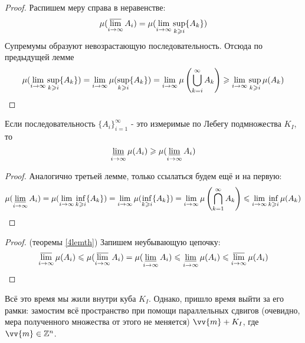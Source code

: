 \begin{proof}
	Распишем меру справа в неравенстве:
	\[
		\mu(\varlimsup_{i \to \infty} A_i) = \mu(\liml_{i \to \infty} \sup_{k \ge i} \{A_k\})
	\]
	Супремумы образуют невозрастающую последовательность. Отсюда по предыдущей лемме
	\[
		\mu(\liml_{i \to \infty} \sup_{k \ge i} \{A_k\}) = \liml_{i \to \infty} \mu(\sup_{k \ge i} \{A_k\}) = \liml_{i \to \infty} \mu\left(\bigcup_{k = i}^\infty A_k\right) \ge \liml_{i \to \infty} \sup_{k \ge i} \mu(A_k)
	\]
\end{proof}

\begin{lemma}
	Если последовательность $\{A_i\}_{i = 1}^\infty$ - это измеримые по Лебегу подмножества $K_I$, то
	\[
		\varliminf_{i \to \infty} \mu(A_i) \ge \mu(\varliminf_{i \to \infty} A_i)
	\]
\end{lemma}

\begin{proof}
	Аналогично третьей лемме, только ссылаться будем ещё и на первую:
	\[
		\mu(\varliminf_{i \to \infty} A_i) = \mu(\liml_{i \to \infty} \inf_{k \ge i} \{A_k\}) = \liml_{i \to \infty} \mu(\inf_{k \ge i} \{A_k\}) = \liml_{i \to \infty} \mu\left(\bigcap_{k = 1}^\infty A_k\right) \le \liml_{i \to \infty} \inf_{k \ge i} \mu(A_k)
	\]
\end{proof}

\begin{proof} (теоремы \ref{4lemth})
	Запишем неубывающую цепочку:
	\[
		\varlimsup_{i \to \infty} \mu(A_i) \le \mu(\varlimsup_{i \to \infty} A_i) = \mu(\varliminf_{i \to \infty} A_i) \le \varliminf_{i \to \infty} \mu(A_i) \le \varlimsup_{i \to \infty} \mu(A_i)
	\]
\end{proof}

\begin{note}
	Всё это время мы жили внутри куба $K_I$. Однако, пришло время выйти за его рамки: замостим всё пространство при помощи параллельных сдвигов (очевидно, мера полученного множества от этого не меняется) $\vv{m} + K_I$, где $\vv{m} \in \Z^n$.
\end{note}